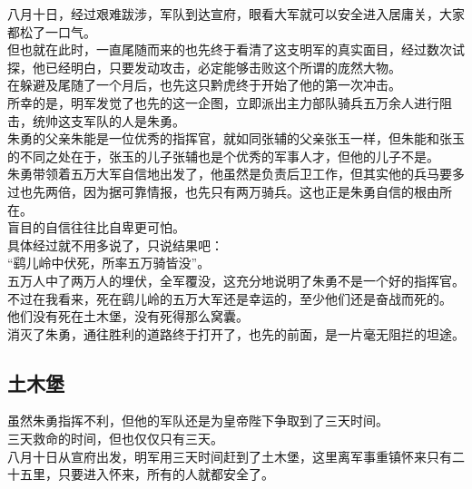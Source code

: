 \begin{multicols}{\theparacolNo}
八月十日，经过艰难跋涉，军队到达宣府，眼看大军就可以安全进入居庸关，大家都松了一口气。\\

但也就在此时，一直尾随而来的也先终于看清了这支明军的真实面目，经过数次试探，他已经明白，只要发动攻击，必定能够击败这个所谓的庞然大物。\\

在躲避及尾随了一个月后，也先这只黔虎终于开始了他的第一次冲击。\\

所幸的是，明军发觉了也先的这一企图，立即派出主力部队骑兵五万余人进行阻击，统帅这支军队的人是朱勇。\\

朱勇的父亲朱能是一位优秀的指挥官，就如同张辅的父亲张玉一样，但朱能和张玉的不同之处在于，张玉的儿子张辅也是个优秀的军事人才，但他的儿子不是。\\

朱勇带领着五万大军自信地出发了，他虽然是负责后卫工作，但其实他的兵马要多过也先两倍，因为据可靠情报，也先只有两万骑兵。这也正是朱勇自信的根由所在。\\

盲目的自信往往比自卑更可怕。\\

具体经过就不用多说了，只说结果吧：\\

“鹞儿岭中伏死，所率五万骑皆没”。\\

五万人中了两万人的埋伏，全军覆没，这充分地说明了朱勇不是一个好的指挥官。\\

不过在我看来，死在鹞儿岭的五万大军还是幸运的，至少他们还是奋战而死的。\\

他们没有死在土木堡，没有死得那么窝囊。\\

消灭了朱勇，通往胜利的道路终于打开了，也先的前面，是一片毫无阻拦的坦途。\\

\subsection{土木堡}
虽然朱勇指挥不利，但他的军队还是为皇帝陛下争取到了三天时间。\\

三天救命的时间，但也仅仅只有三天。\\

八月十日从宣府出发，明军用三天时间赶到了土木堡，这里离军事重镇怀来只有二十五里，只要进入怀来，所有的人就都安全了。\\


\end{multicols}
